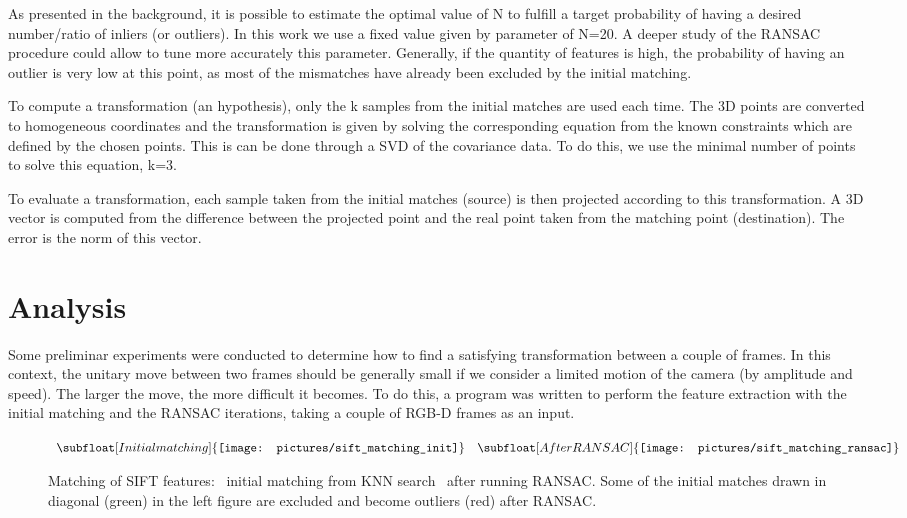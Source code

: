 As presented in the background, it is possible to estimate the optimal value of N to fulfill a target probability of having a desired number/ratio of inliers (or outliers). In this work we use a fixed value given by parameter of N=20. A deeper study of the \gls{RANSAC} procedure could allow to tune more accurately this parameter. Generally, if the quantity of features is high, the probability of having an outlier is very low at this point, as most of the mismatches have already been excluded by the initial matching.


To compute a transformation (an hypothesis), only the k samples from the initial matches are used each time. The 3D points are converted to homogeneous coordinates and the transformation is given by solving the corresponding equation from the known constraints which are defined by the chosen points. This is can be done through a \gls{SVD} of the covariance data. To do this, we use the minimal number of points to solve this equation, k=3.

To evaluate a transformation, each sample taken from the initial matches (source) is then projected according to this transformation. A 3D vector is computed from the difference between the projected point and the real point taken from the matching point (destination). The error is the norm of this vector.

\section{Analysis}

Some preliminar experiments were conducted to determine how to find a satisfying transformation between a couple of frames. In this context, the unitary move between two frames should be generally small if we consider a limited motion of the camera (by amplitude and speed). The larger the move, the more difficult it becomes. To do this, a program was written to perform the feature extraction with the initial matching and the RANSAC iterations, taking a couple of RGB-D frames as an input.

\begin{figure}[H]
\centering$
 \begin{array}{cc}
 \subfloat[Initial matching]{\label{fig:sift_match_1} \texttt{[image: pictures/sift\_matching\_init]}} &
 \subfloat[After RANSAC]{\label{fig:sift_match_2} \texttt{[image: pictures/sift\_matching\_ransac]}}
 \end{array}$
\caption{Matching of SIFT features: \protect{}~initial matching from KNN search \protect{}~after running RANSAC. Some of the initial matches drawn in diagonal (green) in the left figure are excluded and become outliers (red) after RANSAC.}
\end{figure}

